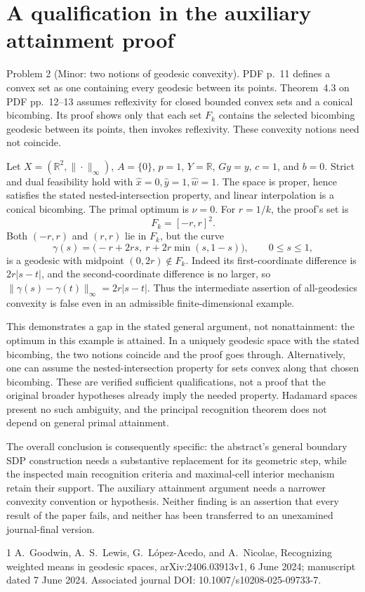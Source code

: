 \documentclass[10pt]{article}
\begin{document}
\section*{A qualification in the auxiliary attainment proof}
Problem 2 (Minor: two notions of geodesic convexity).  PDF p. 11 defines a convex set as one containing every geodesic between its points. Theorem 4.3 on PDF pp. 12–13 assumes reflexivity for closed bounded convex sets and a conical bicombing. Its proof shows only that each set \(F_k\) contains the selected bicombing geodesic between its points, then invokes reflexivity. These convexity notions need not coincide.\par
Let \(X=(\mathbb R^2,\|\cdot\|_\infty)\), \(A=\{0\}\), \(p=1\), \(Y=\mathbb R\), \(Gy=y\), \(c=1\), and \(b=0\). Strict and dual feasibility hold with \(\hat x=0,\hat y=1,\hat w=1\). The space is proper, hence satisfies the stated nested-intersection property, and linear interpolation is a conical bicombing. The primal optimum is \(\nu=0\). For \(r=1/k\), the proof’s set is \[F_k=[-r,r]^2.\] Both \((-r,r)\) and \((r,r)\) lie in \(F_k\), but the curve \[\gamma(s)=\bigl(-r+2rs,\ r+2r\min(s,1-s)\bigr),
 \qquad 0\le s\le1,\] is a geodesic with midpoint \((0,2r)\notin F_k\). Indeed its first-coordinate difference is \(2r|s-t|\), and the second-coordinate difference is no larger, so \(\|\gamma(s)-\gamma(t)\|_\infty=2r|s-t|\). Thus the intermediate assertion of all-geodesics convexity is false even in an admissible finite-dimensional example.\par
This demonstrates a gap in the stated general argument, not nonattainment: the optimum in this example is attained. In a uniquely geodesic space with the stated bicombing, the two notions coincide and the proof goes through. Alternatively, one can assume the nested-intersection property for sets convex along that chosen bicombing. These are verified sufficient qualifications, not a proof that the original broader hypotheses already imply the needed property. Hadamard spaces present no such ambiguity, and the principal recognition theorem does not depend on general primal attainment.\par
The overall conclusion is consequently specific: the abstract’s general boundary SDP construction needs a substantive replacement for its geometric step, while the inspected main recognition criteria and maximal-cell interior mechanism retain their support. The auxiliary attainment argument needs a narrower convexity convention or hypothesis. Neither finding is an assertion that every result of the paper fails, and neither has been transferred to an unexamined journal-final version.\par
1 A. Goodwin, A. S. Lewis, G. López-Acedo, and A. Nicolae, Recognizing weighted means in geodesic spaces, arXiv:2406.03913v1, 6 June 2024; manuscript dated 7 June 2024. Associated journal DOI: 10.1007/s10208-025-09733-7.\par
\end{document}
